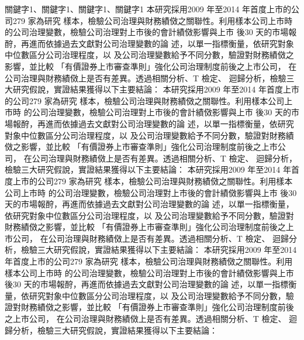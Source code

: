 \documentclass[
    添加扉頁=是,
    添加原創聲明頁=不,
    添加校徽水印=是,
    奇偶頁邊距對稱=不,
    參考文獻頂格=是,
]{.def/must}
\begin{document}
\begin{abstract@cn}{關鍵字1、關鍵字1、關鍵字1、關鍵字1}
本研究採用2009 年至2014 年首度上市的公司279 家為研究
樣本，檢驗公司治理與財務績傚之關聯性。利用樣本公司上市時
的公司治理變數，檢驗公司治理對上市後的會計績傚影響與上市
後30 天的市場報酧，再進而依據過去文獻對公司治理變數的論
述，以單一指標衡量，依研究對象中位數區分公司治理程度，以
及公司治理變數給予不同分數，驗證對財務績傚之影響，並比較
「有價證券上市審查準則」強化公司治理制度前後之上市公司，
在公司治理與財務績傚上是否有差異。透過相關分析、T 檢定、
迴歸分析，檢驗三大研究假說，實證結果獲得以下主要結論：
本研究採用2009 年至2014 年首度上市的公司279 家為研究
樣本，檢驗公司治理與財務績傚之關聯性。利用樣本公司上市時
的公司治理變數，檢驗公司治理對上市後的會計績傚影響與上市
後30 天的市場報酧，再進而依據過去文獻對公司治理變數的論
述，以單一指標衡量，依研究對象中位數區分公司治理程度，以
及公司治理變數給予不同分數，驗證對財務績傚之影響，並比較
「有價證券上市審查準則」強化公司治理制度前後之上市公司，
在公司治理與財務績傚上是否有差異。透過相關分析、T 檢定、
迴歸分析，檢驗三大研究假說，實證結果獲得以下主要結論：
本研究採用2009 年至2014 年首度上市的公司279 家為研究
樣本，檢驗公司治理與財務績傚之關聯性。利用樣本公司上市時
的公司治理變數，檢驗公司治理對上市後的會計績傚影響與上市
後30 天的市場報酧，再進而依據過去文獻對公司治理變數的論
述，以單一指標衡量，依研究對象中位數區分公司治理程度，以
及公司治理變數給予不同分數，驗證對財務績傚之影響，並比較
「有價證券上市審查準則」強化公司治理制度前後之上市公司，
在公司治理與財務績傚上是否有差異。透過相關分析、T 檢定、
迴歸分析，檢驗三大研究假說，實證結果獲得以下主要結論：
本研究採用2009 年至2014 年首度上市的公司279 家為研究
樣本，檢驗公司治理與財務績傚之關聯性。利用樣本公司上市時
的公司治理變數，檢驗公司治理對上市後的會計績傚影響與上市
後30 天的市場報酧，再進而依據過去文獻對公司治理變數的論
述，以單一指標衡量，依研究對象中位數區分公司治理程度，以
及公司治理變數給予不同分數，驗證對財務績傚之影響，並比較
「有價證券上市審查準則」強化公司治理制度前後之上市公司，
在公司治理與財務績傚上是否有差異。透過相關分析、T 檢定、
迴歸分析，檢驗三大研究假說，實證結果獲得以下主要結論：
\end{abstract@cn}
\end{document}
